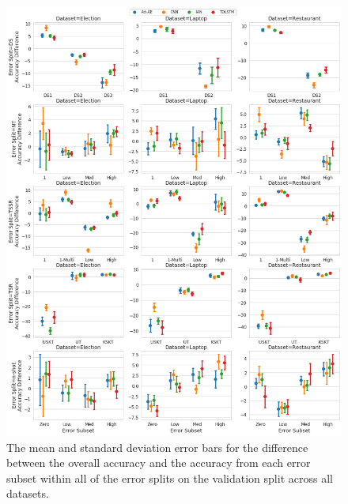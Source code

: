 \begin{figure}
    \centering
    \includegraphics[scale=0.3]{images/augmentation/methods_performance/baseline/validation_error_diff_subsets.png}
    \caption{The mean and standard deviation error bars for the difference between the overall accuracy and the accuracy from each error subset within all of the error splits on the validation split across all datasets.}
    \label{fig:aug_baseline_validation_error_diff_subset}
\end{figure}

